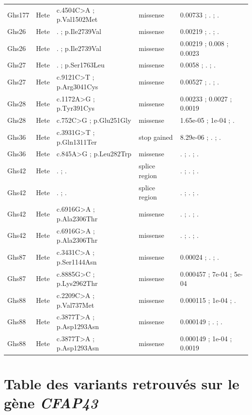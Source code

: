 \documentclass[12pt,twoside]{reedthesis}
\theoremstyle{definition}
\theoremstyle{definition}
\theoremstyle{remark}
\begin{document}
\begin{landscape}
\begin{longtable}[t]{lllll}
  Ghs177 & Hete & c.4504C>A ; p.Val1502Met & missense & 0.00733 ; . ; .\\
  Ghs26 & Hete & . ; p.Ile2739Val & missense & 0.00219 ; . ; .\\
  \addlinespace
  Ghs26 & Hete & . ; p.Ile2739Val & missense & 0.00219 ; 0.008 ; 0.0023\\
  Ghs27 & Hete & . ; p.Ser1763Leu & missense & 0.0058 ; . ; .\\
  Ghs27 & Hete & c.9121C>T ; p.Arg3041Cys & missense & 0.00527 ; . ; .\\
  Ghs28 & Hete & c.1172A>G ; p.Tyr391Cys & missense & 0.00233 ; 0.0027 ; 0.0019\\
  Ghs28 & Hete & c.752C>G ; p.Glu251Gly & missense & 1.65e-05 ; 1e-04 ; .\\
  \addlinespace
  Ghs36 & Hete & c.3931G>T ; p.Gln1311Ter & stop gained & 8.29e-06 ; . ; .\\
  Ghs36 & Hete & c.845A>G ; p.Leu282Trp & missense & . ; . ; .\\
  Ghs42 & Hete & . ; . & splice region & . ; . ; .\\
  Ghs42 & Hete & . ; . & splice region & . ; . ; .\\
  Ghs42 & Hete & c.6916G>A ; p.Ala2306Thr & missense & . ; . ; .\\
  \addlinespace
  Ghs42 & Hete & c.6916G>A ; p.Ala2306Thr & missense & . ; . ; .\\
  Ghs87 & Hete & c.3431C>A ; p.Ser1144Asn & missense & 0.00024 ; . ; .\\
  Ghs87 & Hete & c.8885G>C ; p.Lys2962Thr & missense & 0.000457 ; 7e-04 ; 5e-04\\
  Ghs88 & Hete & c.2209C>A ; p.Val737Met & missense & 0.000115 ; 1e-04 ; .\\
  Ghs88 & Hete & c.3877T>A ; p.Asp1293Asn & missense & 0.000149 ; . ; .\\
  Ghs88 & Hete & c.3877T>A ; p.Asp1293Asn & missense & 0.000149 ; 1e-04 ; 0.0019\\
  \bottomrule
  \end{longtable}
  \end{landscape}
  
  \newpage
  
  \chapter{\texorpdfstring{Table des variants retrouvés sur le gène
  \emph{CFAP43}}{Table des variants retrouvés sur le gène CFAP43}}\label{table-des-variants-retrouves-sur-le-gene-cfap43}
  
\end{document}
